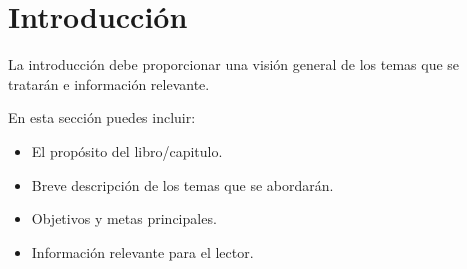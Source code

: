 \clearpage
\cleardoublepage
\chapter*{Introducción}


La introducción debe proporcionar una visión general de los temas que se tratarán e información relevante. 

En esta sección puedes incluir:

\begin{itemize}
    \item El propósito del libro/capitulo.
    \item Breve descripción de los temas que se abordarán.
    \item Objetivos y metas principales.
    \item Información relevante para el lector.
\end{itemize}
